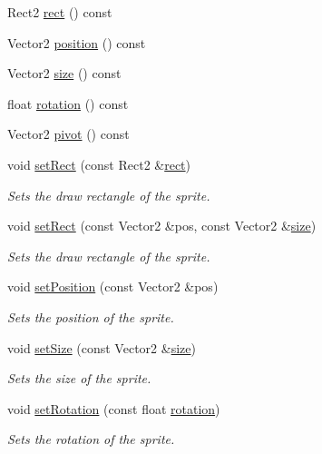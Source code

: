 \begin{DoxyCompactItemize}
Rect2 \hyperlink{class_sprite_a6011e0e39946f6d17b9d2771fbd99001}{rect} () const 
\item 
Vector2 \hyperlink{class_sprite_aad1c4763a3dccefd7213f77554471f6d}{position} () const 
\item 
Vector2 \hyperlink{class_sprite_aee725f563b16e074dc415626b4655beb}{size} () const 
\item 
float \hyperlink{class_sprite_a534abbcdf1f46f3a10d9e49278b82034}{rotation} () const 
\item 
Vector2 \hyperlink{class_sprite_a7a374e768581b432685d98af1a3831ef}{pivot} () const 
\item 
void \hyperlink{class_sprite_afdc7f53cce33d0996aa25a11a3c328e4}{set\-Rect} (const Rect2 \&\hyperlink{class_sprite_a6011e0e39946f6d17b9d2771fbd99001}{rect})
\begin{DoxyCompactList}\small\item\em Sets the draw rectangle of the sprite. \end{DoxyCompactList}\item 
void \hyperlink{class_sprite_ab20ddb2b7421a3d6d788919bc42a998a}{set\-Rect} (const Vector2 \&pos, const Vector2 \&\hyperlink{class_sprite_aee725f563b16e074dc415626b4655beb}{size})
\begin{DoxyCompactList}\small\item\em Sets the draw rectangle of the sprite. \end{DoxyCompactList}\item 
void \hyperlink{class_sprite_a1c82bc298cce69e936f0821b1103d7fc}{set\-Position} (const Vector2 \&pos)
\begin{DoxyCompactList}\small\item\em Sets the position of the sprite. \end{DoxyCompactList}\item 
void \hyperlink{class_sprite_a33fe51395aa3d372a16ccda8df5c7b12}{set\-Size} (const Vector2 \&\hyperlink{class_sprite_aee725f563b16e074dc415626b4655beb}{size})
\begin{DoxyCompactList}\small\item\em Sets the size of the sprite. \end{DoxyCompactList}\item 
void \hyperlink{class_sprite_aad424b86963bde58e6f62074c4b2c037}{set\-Rotation} (const float \hyperlink{class_sprite_a534abbcdf1f46f3a10d9e49278b82034}{rotation})
\begin{DoxyCompactList}\small\item\em Sets the rotation of the sprite. \end{DoxyCompactList}\item 

\end{DoxyCompactItemize}
